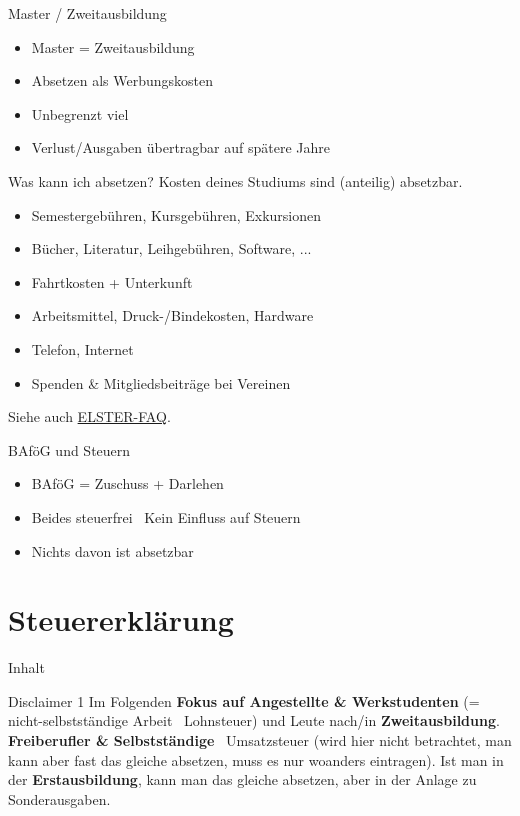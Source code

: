 \documentclass{beamer}
\begin{document}
		\begin{frame}{Master / Zweitausbildung}
			\begin{itemize}
				\item Master = Zweitausbildung
				\item Absetzen als Werbungskosten
				\item Unbegrenzt viel
				\item Verlust/Ausgaben übertragbar auf spätere Jahre
			\end{itemize}
		\end{frame}
	
		\begin{frame}{Was kann ich absetzen?}
			Kosten deines Studiums sind (anteilig) absetzbar.\n
			\begin{itemize}
				\item Semestergebühren, Kursgebühren, Exkursionen
				\item Bücher, Literatur, Leihgebühren, Software, ...
				\item Fahrtkosten + Unterkunft
				\item Arbeitsmittel, Druck-/Bindekosten, Hardware
				\item Telefon, Internet
				\item Spenden \& Mitgliedsbeiträge bei Vereinen
			\end{itemize}\n
			Siehe auch \href{https://www.elster.de/eportal/helpGlobal?themaGlobal=help_est_ufa_10_2023\#c9718}{ELSTER-FAQ}.
		\end{frame}
	
		\begin{frame}{BAföG und Steuern}
			\begin{itemize}
				\item BAföG = Zuschuss + Darlehen
				\item Beides steuerfrei \textrightarrow\ Kein Einfluss auf Steuern
				\item Nichts davon ist absetzbar
			\end{itemize}
		\end{frame}
	
	\section{Steuererklärung}
	
		\begin{frame}[t]{Inhalt}
		\end{frame}
	
		\begin{frame}{Disclaimer 1}
			Im Folgenden \textbf{Fokus auf Angestellte \& Werkstudenten} (= nicht-selbstständige Arbeit \textrightarrow\ Lohnsteuer) und Leute nach/in \textbf{Zweitausbildung}.\n\pause
			\textbf{Freiberufler \& Selbstständige} \textrightarrow\ Umsatzsteuer (wird hier nicht betrachtet, man kann aber fast das gleiche absetzen, muss es nur woanders eintragen).\n\pause
			Ist man in der \textbf{Erstausbildung}, kann man das gleiche absetzen, aber in der Anlage zu Sonderausgaben.
		\end{frame}
		
\end{document}
